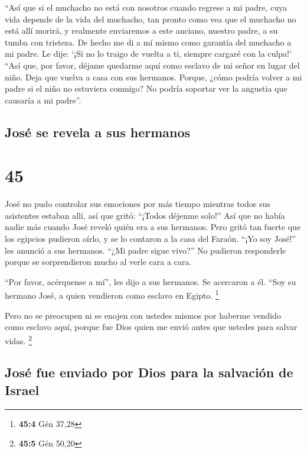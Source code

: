 ``Así que si el muchacho no está con nosotros cuando
regrese a mi padre, cuya vida depende de la vida del muchacho,
 tan pronto como vea que el muchacho no está allí morirá,
y realmente enviaremos a este anciano, nuestro padre, a su tumba con
tristeza.  De hecho me di a mí mismo como garantía del
muchacho a mi padre. Le dije: `¡Si no lo traigo de vuelta a ti, siempre
cargaré con la culpa!'  ``Así que, por favor, déjame
quedarme aquí como esclavo de mi señor en lugar del niño. Deja que
vuelva a casa con sus hermanos.  Porque, ¿cómo podría
volver a mi padre si el niño no estuviera conmigo? No podría soportar
ver la angustia que causaría a mi padre''.

\hypertarget{josuxe9-se-revela-a-sus-hermanos}{%
\subsection{José se revela a sus
hermanos}\label{josuxe9-se-revela-a-sus-hermanos}}

\hypertarget{section-44}{%
\section{45}\label{section-44}}

 José no pudo controlar sus emociones por más tiempo
mientras todos sus asistentes estaban allí, así que gritó: ``¡Todos
déjenme solo!'' Así que no había nadie más cuando José reveló quién era
a sus hermanos.  Pero gritó tan fuerte que los egipcios
pudieron oírlo, y se lo contaron a la casa del Faraón. 
``¡Yo soy José!'' les anunció a sus hermanos. ``¿Mi padre sigue vivo?''
No pudieron responderle porque se sorprendieron mucho al verle cara a
cara.

 ``Por favor, acérquense a mí'', les dijo a sus hermanos.
Se acercaron a él. ``Soy su hermano José, a quien vendieron como esclavo
en Egipto. \footnote{\textbf{45:4} Gén 37,28}

 Pero no se preocupen ni se enojen con ustedes mismos por
haberme vendido como esclavo aquí, porque fue Dios quien me envió antes
que ustedes para salvar vidas. \footnote{\textbf{45:5} Gén 50,20}

\hypertarget{josuxe9-fue-enviado-por-dios-para-la-salvaciuxf3n-de-israel}{%
\subsection{José fue enviado por Dios para la salvación de
Israel}\label{josuxe9-fue-enviado-por-dios-para-la-salvaciuxf3n-de-israel}}


